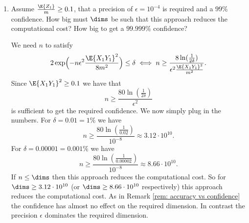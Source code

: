 \begin{exercise}
\begin{enumerate}[label=(\alph*), noitemsep]
        \item Assume \(\frac{\E{Z_1}}{m} \ge 0.1\), that a precision of \(\epsilon
        = 10^{-4}\) is required and a \(99\%\) confidence. How big must
        \(\dims\) be such that this approach reduces the computational cost?
        How big to get a \(99.999\%\) confidence?
        \begin{solution}
            We need \(n\) to satisfy
            \[
                2\exp\Bigl(-n \epsilon^2 \frac{\E{X_1 Y_1}^2}{8 m^2}\Bigr) \le \delta 
                \iff n \ge \frac{8\ln(\frac1{2\delta})}{\epsilon^2 \frac{\E{X_1 Y_1}^2}{m^2}}.
            \]
            Since \(\E{X_1 Y_1}^2 \ge 0.1\) we have that
            \[
                n \ge \frac{80\ln(\frac1{2\delta})}{\epsilon^2}
            \]
            is sufficient to get the required confidence. We now simply
            plug in the numbers. For \(\delta = 0.01 = 1\%\) we have
            \[
                n \ge \frac{80\ln(\frac1{0.02})}{10^{-8}} \approx 3.12 \cdot 10^{10}.
            \]
            For \(\delta = 0.00001 = 0.001\%\) we have
            \[
                n \ge \frac{80\ln(\frac1{0.00002})}{10^{-8}} \approx 8.66 \cdot 10^{10}.
            \]
            If \(n\le \dims\) then this approach reduces the computational cost.
            So for \(\dims \ge 3.12 \cdot 10^{10}\) (or \(\dims \ge 8.66 \cdot 10^{10}\) respectively)
            this approach reduces the computational cost. As in Remark \ref{rem:
            accuracy vs confidence} the confidence has almost no effect on the
            required dimension. In contrast the precision \(\epsilon\)
            dominates the required dimension.
        \end{solution}
    \end{enumerate}
\end{exercise}

